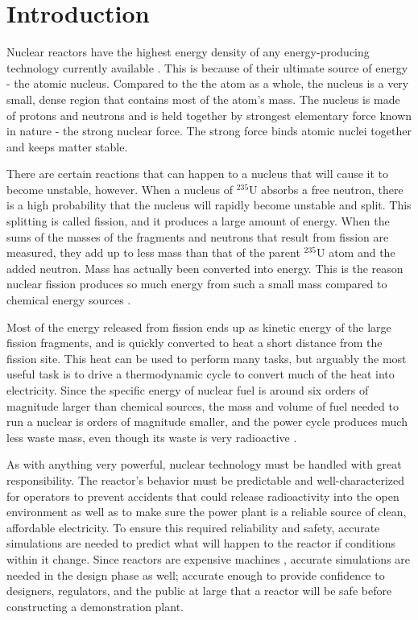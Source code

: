 \chapter{Introduction}

Nuclear reactors have the highest energy density of any energy-producing technology currently available \cite{energy_density}.  This is because of their ultimate source of energy - the atomic nucleus.  Compared to the the atom as a whole, the nucleus is a very small, dense region that contains most of the atom's mass.  The nucleus is made of protons and neutrons and is held together by strongest elementary force known in nature - the strong nuclear force. The strong force binds atomic nuclei together and keeps matter stable.  

There are certain reactions that can happen to a nucleus that will cause it to become unstable, however.  When a nucleus of $^{235}$U absorbs a free neutron, there is a high probability that the nucleus will rapidly become unstable and split.  This splitting is called fission, and it produces a large amount of energy.  When the sums of the masses of the fragments and neutrons that result from fission are measured, they add up to less mass than that of the parent $^{235}$U atom and the added neutron.  Mass has actually been converted into energy. This is the reason nuclear fission produces so much energy from such a small mass compared to chemical energy sources \cite{krane, duderstadt}.   

Most of the energy released from fission ends up as kinetic energy of the large fission fragments, and is quickly converted to heat a short distance from the fission site.  This heat can be used to perform many tasks, but arguably the most useful task is to drive a thermodynamic cycle to convert much of the heat into electricity.  Since the specific energy of nuclear fuel is around six orders of magnitude larger than chemical sources, the mass and volume of fuel needed to run a nuclear is orders of magnitude smaller, and the power cycle produces much less waste mass, even though its waste is very radioactive \cite{waste_mass}.  

As with anything very powerful, nuclear technology must be handled with great responsibility.  The reactor's behavior must be predictable and well-characterized for operators to prevent accidents that could release radioactivity into the open environment as well as to make sure the power plant is a reliable source of clean, affordable electricity.  To ensure this required reliability and safety, accurate simulations are needed to predict what will happen to the reactor if conditions within it change.  Since reactors are  expensive machines \cite{nuclear_cost}, accurate simulations are needed in the design phase as well; accurate enough to provide confidence to designers, regulators, and the public at large that a reactor will be safe before constructing a demonstration plant.  

